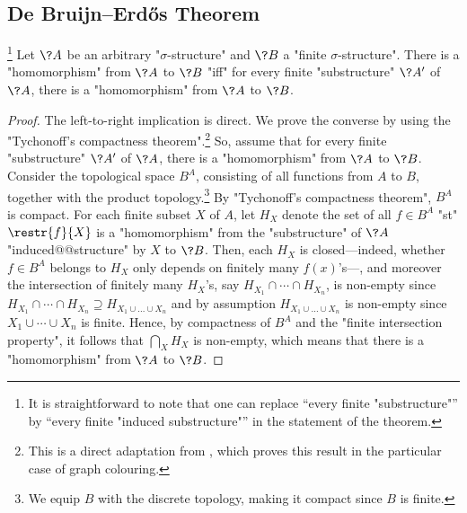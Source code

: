 \subsection{De Bruijn–Erdős Theorem}

\AP\begin{proposition}
	\!\footnote{It is straightforward to note that
	one can replace ``every finite "substructure"'' by
	``every finite "induced substructure"'' in the statement of the theorem.}%
	\AP\label{prop:de-bruijn-erdos}
	Let $\?A$ be an arbitrary "$\sigma$-structure" and $\?B$ a "finite $\sigma$-structure".
	There is a "homomorphism" from $\?A$ to $\?B$ "iff" for every finite "substructure" $\?A'$
	of $\?A$, there is a "homomorphism" from $\?A$ to $\?B$.
\end{proposition}

\begin{proof}
	The left-to-right implication is direct.
	We prove the converse by using the "Tychonoff's compactness theorem".\footnote{This is a direct adaptation from \cite[\S~``Proof'']{Wikipedia2024DeBruijnErdos}, 
	which proves this result in the particular case of graph colouring.}
	So, assume that for every finite "substructure" $\?A'$ of $\?A$,
	there is a "homomorphism" from $\?A$ to $\?B$. 
	Consider the topological space $B^A$, consisting of all functions from $A$ to $B$,
	together with the product topology.\footnote{We equip $B$ with the discrete topology,
	making it compact since $B$ is finite.} By "Tychonoff's compactness theorem",
	$B^A$ is compact. For each finite subset $X$ of $A$, let
	$H_X$ denote the set of all $f \in B^A$ "st" $\restr{f}{X}$ is a "homomorphism"
	from the "substructure" of $\?A$ "induced@@structure" by $X$ to $\?B$.
	Then, each $H_X$ is closed---indeed, whether $f\in B^A$ belongs to $H_X$ only depends
	on finitely many $f(x)$'s---, and moreover the intersection of finitely many
	$H_X$'s, say $H_{X_1} \cap \cdots \cap H_{X_n}$, is non-empty since
	$H_{X_1} \cap \cdots \cap H_{X_n} \supseteq H_{X_1\cup \hdots \cup X_n}$
	and by assumption $H_{X_1\cup \hdots \cup X_n}$ is non-empty since $X_1 \cup \cdots \cup X_n$ is finite. Hence, by compactness of $B^A$ and the "finite intersection property", it follows
	that $\bigcap_X H_X$ is non-empty, which means that there is a "homomorphism" from $\?A$ to $\?B$.
\end{proof}

